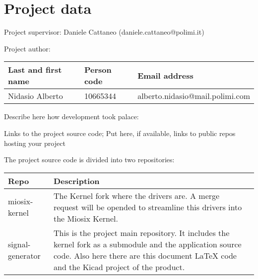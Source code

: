 \section{Project data}

Project supervisor: Daniele Cattaneo (daniele.cattaneo@polimi.it)

Project author:
\begin{center}
    \begin{tabular}{lll}
        Last and first name & Person code & Email address \\
        \hline
        Nidasio Alberto & 10665344 & alberto.nidasio@mail.polimi.com \\                  
    \end{tabular}
\end{center}

Describe here how development took palace:

Links to the project source code; Put here, if available, links to public repos hosting your project

The project source code is divided into two repositories:
\begin{center}
    \begin{tabular}{lll}
        Repo & Description \\
        \hline
        miosix-kernel & The Kernel fork where the drivers are. A merge request will be opended to streamline this drivers into the Miosix Kernel. \\
        signal-generator & This is the project main repository. It includes the kernel fork as a submodule and the application source code. Also here there are this document LaTeX code and the Kicad project of the product.                  
    \end{tabular}
\end{center}
